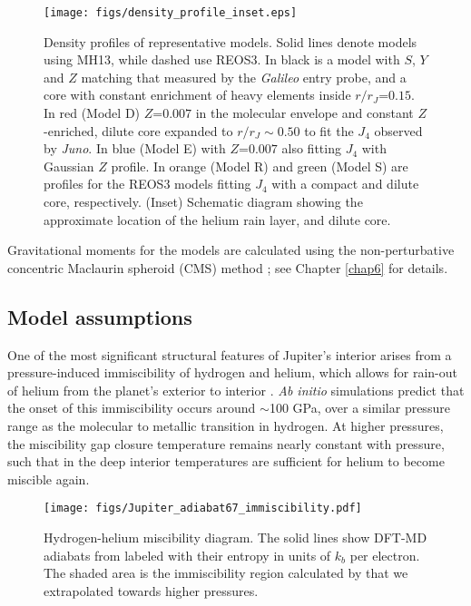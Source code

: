 \begin{figure}[h]
\centering

\texttt{[image: figs/density\_profile\_inset.eps]}

\caption{Density profiles of representative models. Solid lines denote models
    using MH13, while dashed use REOS3. In black is a model with $S$, $Y$ and $Z$
    matching that measured by the \textit{Galileo} entry probe, and a core with constant
    enrichment of heavy elements inside $r/r_J$=$0.15$.  In red (Model
    D) $Z$=$0.007$ in the molecular envelope and constant $Z$-enriched, dilute
    core expanded to $r/r_J\sim0.50$ to fit the $J_4$ observed by
    \textit{Juno}. In blue (Model E) with $Z$=$0.007$ also fitting $J_4$ with
    Gaussian $Z$ profile. In orange (Model R) and green (Model S) are profiles
    for the REOS3 models fitting $J_4$ with a compact and dilute core,
    respectively. (Inset) Schematic diagram showing the approximate location of
the helium rain layer, and dilute core.}
\label{fig:density}
\end{figure}

Gravitational moments for the models are calculated using the non-perturbative
concentric Maclaurin spheroid (CMS) method
\citep{hubbard2012,hubbard2013,hubbard2016,wahl2016}; see Chapter \ref{chap6} for details. 

\subsection{Model assumptions}\label{sec:model}

One of the most significant structural features of Jupiter's interior
arises from a pressure-induced immiscibility of hydrogen and helium, which allows for
rain-out of helium from the planet's exterior to interior
\citep{stevenson1977a,stevenson1977b}. \textit{Ab initio} simulations
\citep{Morales2009,Lorenzen2009,Wilson2010,morales2013} predict that the onset of this
immiscibility occurs around $\sim$100 GPa, over a similar pressure range as the
molecular to metallic transition in hydrogen. At higher pressures, the miscibility
gap closure temperature remains nearly constant with pressure, such that in the deep
interior temperatures are sufficient for helium to become miscible again.


\begin{figure}[h]
  \begin{center}
    \noindent\texttt{[image: figs/Jupiter\_adiabat67\_immiscibility.pdf]}
  \end{center}
  \caption{Hydrogen-helium miscibility diagram. The solid lines show
    DFT-MD adiabats from \citet{militzer2013a} labeled with their entropy in
    units of $k_b$ per electron. The shaded area is the immiscibility
    region calculated by \citet{morales2013} that we extrapolated
    towards higher pressures. }
  \label{fig:imm}
\end{figure}


